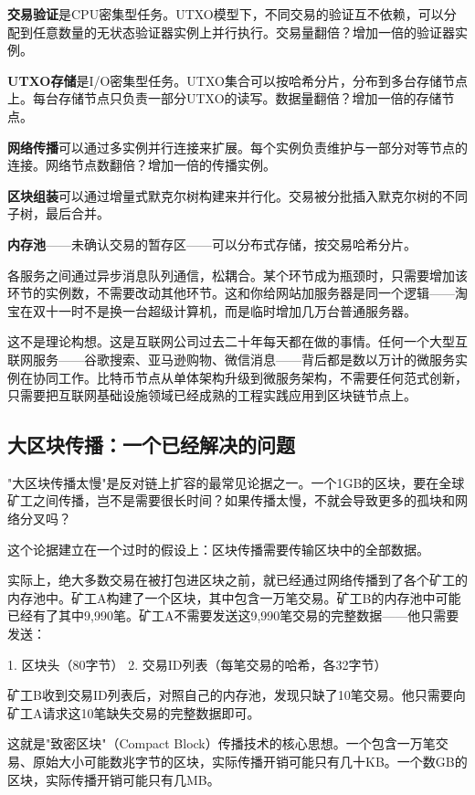 \documentclass[a4paper,12pt,openany]{ctexbook}
\begin{document}
\textbf{交易验证}是CPU密集型任务。UTXO模型下，不同交易的验证互不依赖，可以分配到任意数量的无状态验证器实例上并行执行。交易量翻倍？增加一倍的验证器实例。

\textbf{UTXO存储}是I/O密集型任务。UTXO集合可以按哈希分片，分布到多台存储节点上。每台存储节点只负责一部分UTXO的读写。数据量翻倍？增加一倍的存储节点。

\textbf{网络传播}可以通过多实例并行连接来扩展。每个实例负责维护与一部分对等节点的连接。网络节点数翻倍？增加一倍的传播实例。

\textbf{区块组装}可以通过增量式默克尔树构建来并行化。交易被分批插入默克尔树的不同子树，最后合并。

\textbf{内存池}——未确认交易的暂存区——可以分布式存储，按交易哈希分片。

各服务之间通过异步消息队列通信，松耦合。某个环节成为瓶颈时，只需要增加该环节的实例数，不需要改动其他环节。这和你给网站加服务器是同一个逻辑——淘宝在双十一时不是换一台超级计算机，而是临时增加几万台普通服务器。

这不是理论构想。这是互联网公司过去二十年每天都在做的事情。任何一个大型互联网服务——谷歌搜索、亚马逊购物、微信消息——背后都是数以万计的微服务实例在协同工作。比特币节点从单体架构升级到微服务架构，不需要任何范式创新，只需要把互联网基础设施领域已经成熟的工程实践应用到区块链节点上。


\subsection*{大区块传播：一个已经解决的问题}


"大区块传播太慢"是反对链上扩容的最常见论据之一。一个1GB的区块，要在全球矿工之间传播，岂不是需要很长时间？如果传播太慢，不就会导致更多的孤块和网络分叉吗？

这个论据建立在一个过时的假设上：区块传播需要传输区块中的全部数据。

实际上，绝大多数交易在被打包进区块之前，就已经通过网络传播到了各个矿工的内存池中。矿工A构建了一个区块，其中包含一万笔交易。矿工B的内存池中可能已经有了其中9,990笔。矿工A不需要发送这9,990笔交易的完整数据——他只需要发送：

1. 区块头（80字节）
2. 交易ID列表（每笔交易的哈希，各32字节）

矿工B收到交易ID列表后，对照自己的内存池，发现只缺了10笔交易。他只需要向矿工A请求这10笔缺失交易的完整数据即可。

这就是"致密区块"（Compact Block）传播技术的核心思想。一个包含一万笔交易、原始大小可能数兆字节的区块，实际传播开销可能只有几十KB。一个数GB的区块，实际传播开销可能只有几MB。
\end{document}
